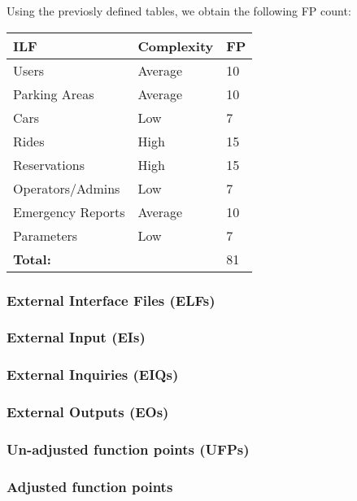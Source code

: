 Using the previosly defined tables, we obtain the following FP count: %

	\begin{tabular}{|l|l|l|}
		\hline
		\textbf{ILF} & \textbf{Complexity} & \textbf{FP}\\ \hline
		Users & Average & 10\\ \hline
		Parking Areas & Average & 10\\ \hline
		Cars & Low & 7\\ \hline
		Rides & High & 15\\ \hline
		Reservations & High & 15\\ \hline
		Operators/Admins & Low & 7\\ \hline
		Emergency Reports & Average & 10\\ \hline
		Parameters & Low & 7\\ \hline
		\multicolumn{2}{|l|}{\textbf{Total:}}& 81 \\ \hline
	\end{tabular}


\subsubsection{External Interface Files (ELFs)}

\subsubsection{External Input (EIs)}

\subsubsection{External Inquiries (EIQs)}

\subsubsection{External Outputs (EOs)}

\subsubsection{Un-adjusted function points (UFPs)}

\subsubsection{Adjusted function points}